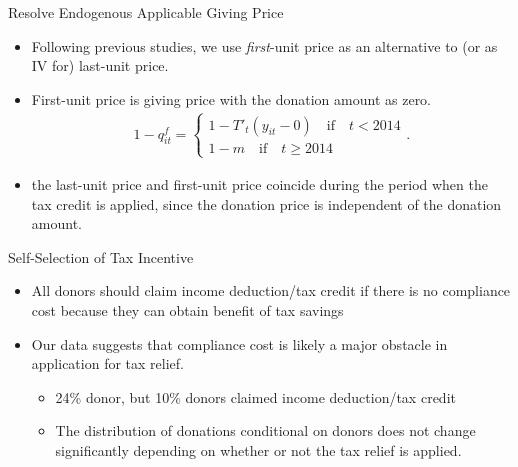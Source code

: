 \documentclass[
  ignorenonframetext,
  aspectratio=169,
]{beamer}
\providecommand{\tightlist}{%
  \setlength{\itemsep}{0pt}\setlength{\parskip}{0pt}}
\begin{document}
\begin{frame}{Resolve Endogenous Applicable Giving Price}
\protect\hypertarget{resolve-endogenous-applicable-giving-price}{}
\begin{itemize}
\tightlist
\item
  Following previous studies, we use \emph{first}-unit price as an alternative to (or as IV for) last-unit price.
\item
  First-unit price is giving price with the donation amount as zero.
  \begin{align}
  1 - q^f_{it} =
  \begin{cases}
    1 - T'_t(y_{it} - 0)  \quad\text{if}\quad t < 2014  \\
    1 - m \quad\text{if}\quad t \ge 2014
  \end{cases}.
  \end{align}
\item
  the last-unit price and first-unit price coincide during the period when the tax credit is applied,
  since the donation price is independent of the donation amount.
\end{itemize}
\end{frame}

\begin{frame}{Self-Selection of Tax Incentive}
\protect\hypertarget{self-selection-of-tax-incentive}{}
\begin{itemize}
\tightlist
\item
  All donors should claim income deduction/tax credit if there is no compliance cost
  because they can obtain benefit of tax savings
\item
  Our data suggests that compliance cost is likely a major obstacle in application for tax relief.

  \begin{itemize}
  \tightlist
  \item
    24\% donor, but 10\% donors claimed income deduction/tax credit
  \item
    The distribution of donations conditional on donors does not change significantly depending on
    whether or not the tax relief is applied.
  \end{itemize}
\end{itemize}
\end{frame}
\end{document}

